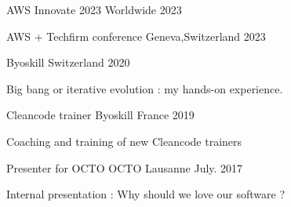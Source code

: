 

\begin{cventries}
    
{AWS Innovate 2023} %
{Worldwide} %
{2023} %
{
    \begin{cvitems} %
    \end{cvitems}
}
{AWS + Techfirm conference} %
{Geneva,Switzerland} %
{2023} %
{
    \begin{cvitems} %
    \end{cvitems}
}
    
{Byoskill} %
{Switzerland} %
{2020} %
{
    \begin{cvitems} %
        \item {Big bang or iterative evolution : my hands-on experience.}
    \end{cvitems}
}
	\cventry
{Cleancode trainer} %
{Byoskill} %
{France} %
{2019} %
{
    \begin{cvitems} %
        \item {Coaching and training of new Cleancode trainers}
    \end{cvitems}
}
\cventry
{Presenter for OCTO} %
{OCTO} %
{Lausanne} %
{July. 2017} %
{
    \begin{cvitems} %
        \item {Internal presentation : Why should we love our software ?}
    \end{cvitems}
}


\end{cventries}
